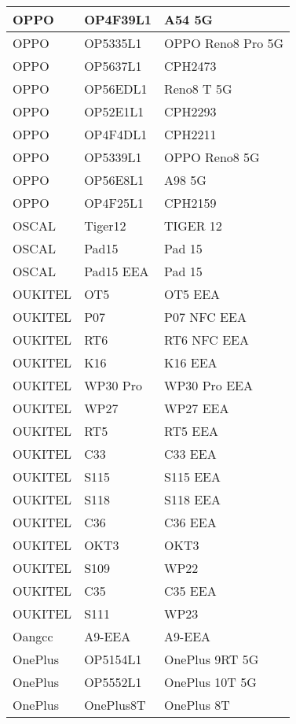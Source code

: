 \begin{tabularx}{\linewidth}{|l|X|X|}
        OPPO & OP4F39L1 & A54 5G \\ \hline
        OPPO & OP5335L1 & OPPO Reno8 Pro 5G \\ \hline
        OPPO & OP5637L1 & CPH2473 \\ \hline
        OPPO & OP56EDL1 & Reno8 T 5G \\ \hline
        OPPO & OP52E1L1 & CPH2293 \\ \hline
        OPPO & OP4F4DL1 & CPH2211 \\ \hline
        OPPO & OP5339L1 & OPPO Reno8 5G \\ \hline
        OPPO & OP56E8L1 & A98 5G \\ \hline
        OPPO & OP4F25L1 & CPH2159 \\ \hline
        OSCAL & Tiger12 & TIGER 12 \\ \hline
        OSCAL & Pad15 & Pad 15 \\ \hline
        OSCAL & Pad15 EEA & Pad 15 \\ \hline
        OUKITEL & OT5 & OT5 EEA \\ \hline
        OUKITEL & P07 & P07 NFC EEA \\ \hline
        OUKITEL & RT6 & RT6 NFC EEA \\ \hline
        OUKITEL & K16 & K16 EEA \\ \hline
        OUKITEL & WP30 Pro & WP30 Pro EEA \\ \hline
        OUKITEL & WP27 & WP27 EEA \\ \hline
        OUKITEL & RT5 & RT5 EEA \\ \hline
        OUKITEL & C33 & C33 EEA \\ \hline
        OUKITEL & S115 & S115 EEA \\ \hline
        OUKITEL & S118 & S118 EEA \\ \hline
        OUKITEL & C36 & C36 EEA \\ \hline
        OUKITEL & OKT3 & OKT3 \\ \hline
        OUKITEL & S109 & WP22 \\ \hline
        OUKITEL & C35 & C35 EEA \\ \hline
        OUKITEL & S111 & WP23 \\ \hline
        Oangcc & A9-EEA & A9-EEA \\ \hline
        OnePlus & OP5154L1 & OnePlus 9RT 5G \\ \hline
        OnePlus & OP5552L1 & OnePlus 10T 5G \\ \hline
        OnePlus & OnePlus8T & OnePlus 8T \\ \hline

\end{tabularx}
